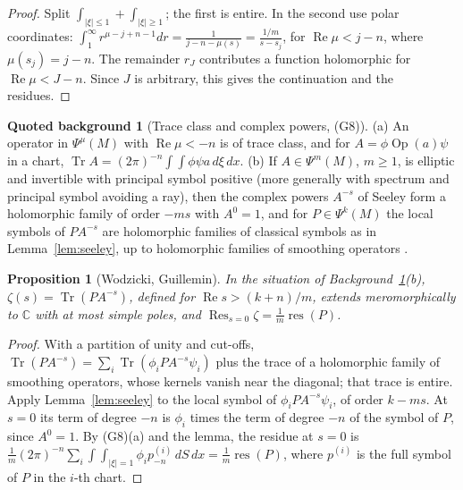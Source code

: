 \documentclass[11pt,oneside,reqno]{article}
\DeclareMathOperator{\Tr}{Tr}
\DeclareMathOperator{\res}{res}
\DeclareMathOperator{\Res}{Res}
\DeclareMathOperator{\Op}{Op}
\newcommand{\C}{\mathbb C}
\theoremstyle{plain}
\newtheorem{proposition}[theorem]{Proposition}
\theoremstyle{definition}
\newtheorem{background}[theorem]{Quoted background}
\theoremstyle{remark}
\begin{document}
\begin{proof}
Split \(\int_{|\xi|\le1}+\int_{|\xi|\ge1}\); the first is entire. In the second use polar coordinates:
\(\int_1^\infty r^{\mu-j+n-1}dr=\frac1{j-n-\mu(s)}=\frac{1/m}{s-s_j}\), for \(\operatorname{Re}\mu<j-n\), where
\(\mu(s_j)=j-n\). The remainder \(r_J\) contributes a function holomorphic for
\(\operatorname{Re}\mu<J-n\). Since \(J\) is arbitrary, this gives the continuation and the
residues.
\end{proof}

\begin{background}[Trace class and complex powers, (G8)]\label{bg:seeley}
(a) An operator in \(\Psi^\mu(M)\) with \(\operatorname{Re}\mu<-n\) is of trace class, and for
\(A=\phi\Op(a)\psi\) in a chart, \(\Tr A=(2\pi)^{-n}\int\!\!\int\phi\psi a\,d\xi\,dx\).
(b) If \(A\in\Psi^m(M)\), \(m\ge1\), is elliptic and invertible with principal symbol
positive (more generally with spectrum and principal symbol avoiding a ray),
then the complex powers \(A^{-s}\) of Seeley form a holomorphic family of order
\(-ms\) with \(A^0=1\), and for \(P\in\Psi^k(M)\) the local symbols of \(PA^{-s}\) are holomorphic
families of classical symbols as in Lemma~\ref{lem:seeley}, up to holomorphic
families of smoothing operators \cite{Seeley,Shubin}.
\end{background}

\begin{proposition}[Wodzicki, Guillemin]\label{prop:zeta}
In the situation of Background~\ref{bg:seeley}(b), \(\zeta(s)=\Tr(PA^{-s})\), defined for
\(\operatorname{Re}s>(k+n)/m\), extends meromorphically to \(\C\) with at most simple poles, and
\(\Res_{s=0}\zeta=\frac1m\res(P)\).
\end{proposition}

\begin{proof}
With a partition of unity and cut-offs, \(\Tr(PA^{-s})=\sum_i\Tr(\phi_iPA^{-s}\psi_i)\) plus
the trace of a holomorphic family of smoothing operators, whose kernels vanish
near the diagonal; that trace is entire. Apply Lemma~\ref{lem:seeley} to the local
symbol of \(\phi_iPA^{-s}\psi_i\), of order \(k-ms\). At \(s=0\) its term of degree \(-n\) is \(\phi_i\)
times the term of degree \(-n\) of the symbol of \(P\), since \(A^0=1\). By (G8)(a) and the lemma, the residue at \(s=0\) is
\(\frac1m(2\pi)^{-n}\sum_i\int\!\!\int_{|\xi|=1}\phi_ip^{(i)}_{-n}\,dS\,dx=\frac1m\res(P)\), where \(p^{(i)}\) is
the full symbol of \(P\) in the \(i\)-th chart.
\end{proof}
\end{document}
